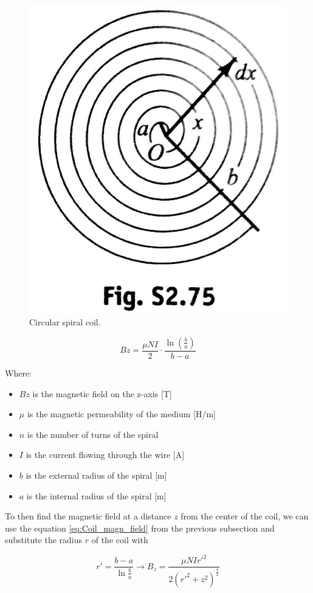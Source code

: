 \begin{figure}
    \centering
    \includegraphics[scale=0.4]{Chapters/Chapter2/PCB_coils/Figures/spiral_windings.jpg} %
    \caption[Coil spiral]{Circular spiral coil.}
    \label{fig:Coil_spiral}
\end{figure}

\begin{equation}
    Bz = \frac{\mu N I}{2} \cdot \frac{\ln(\frac{b}{a})}{b-a} %
    \label{eq:Spiral_magn_field_eq}
\end{equation}

Where:
\begin{itemize}
    \item $Bz$ is the magnetic field on the z-axis [T]
    \item $\mu$ is the magnetic permeability of the medium [H/m]
    \item $n$ is the number of turns of the spiral
    \item $I$ is the current flowing through the wire [A]
    \item $b$ is the external radius of the spiral [m]
    \item $a$ is the internal radius of the spiral [m]
\end{itemize}

To then find the magnetic field at a distance $z$ from the center of the coil, we can use the equation \ref{eq:Coil_magn_field} from the previous subsection and substitute the radius $r$ of the coil with   

\begin{equation}
    r' = \frac{b-a}{\ln\frac{b}{a}} \rightarrow B_z = \frac{\mu N I r'^2}{2(r'^2+z^2)^\frac{3}{2}} \label{eq:Spiral_magn_field_dist}
\end{equation}

